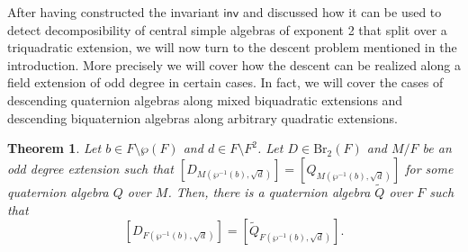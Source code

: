 \documentclass{amsart}
\newtheorem{theorem}[definition]{Theorem}
\numberwithin{equation}{section}
\newcommand{\BrTwo}{\mathrm{Br}_2}
\newcommand{\inv}{\mathsf{inv}}
\begin{document}
After having constructed the invariant $\inv$ and discussed how it can be used to detect decomposibility of central simple algebras of exponent 2 that split over a triquadratic extension, we will now turn to the descent problem mentioned in the introduction.
More precisely we will cover how the descent can be realized along a field extension of odd degree in certain cases. 
In fact, we will cover the cases of descending quaternion algebras along mixed biquadratic extensions and descending biquaternion algebras along arbitrary quadratic extensions.

\begin{theorem} \label{thm_DescentAlgebras}
	Let $b \in F\setminus \wp(F)$ and $d \in F\setminus F^2$.
    Let $D \in \BrTwo(F)$ and $M/F$ be an odd degree extension such that $[D_{M(\wp^{-1}(b), \sqrt d)}] = [Q_{M(\wp^{-1}(b), \sqrt d)}]$ for some quaternion algebra $Q$ over $M$.
    Then, there is a quaternion algebra $\tilde Q$ over $F$ such that 
    \[[D_{F(\wp^{-1}(b), \sqrt d)}] = [\tilde Q_{F(\wp^{-1}(b), \sqrt d)}].\]
\end{theorem}
\end{document}
